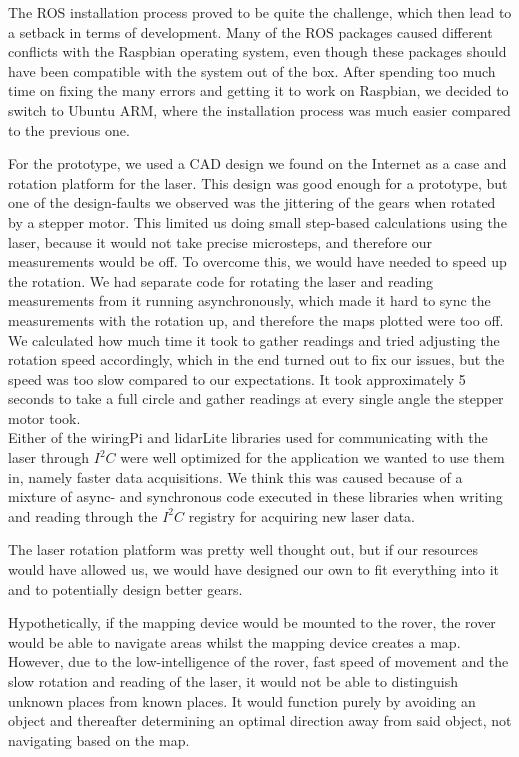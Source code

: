 The ROS installation process proved to be quite the challenge, which then lead to a setback in terms of development. Many of the ROS packages caused different conflicts with the Raspbian operating system, even though these packages should have been compatible with the system out of the box. After spending too much time on fixing the many errors and getting it to work on Raspbian, we decided to switch to Ubuntu ARM, where the installation process was much easier compared to the previous one.

For the prototype, we used a CAD design we found on the Internet as a case and rotation platform for the laser. This design was good enough for a prototype, but one of the design-faults we observed was the jittering of the gears when rotated by a stepper motor. This limited us doing small step-based calculations using the laser, because it would not take precise microsteps, and therefore our measurements would be off. To overcome this, we would have needed to speed up the rotation. We had separate code for rotating the laser and reading measurements from it running asynchronously, which made it hard to sync the measurements with the rotation up, and therefore the maps plotted were too off. We calculated how much time it took to gather readings and tried adjusting the rotation speed accordingly, which in the end turned out to fix our issues, but the speed was too slow compared to our expectations. It took approximately 5 seconds to take a full circle and gather readings at every single angle the stepper motor took.\\ 
Either of the wiringPi and lidarLite libraries used for communicating with the laser through $I^2C$ were well optimized for the application we wanted to use them in, namely faster data acquisitions. We think this was caused because of a mixture of async- and synchronous code executed in these libraries when writing and reading through the $I^2C$ registry for acquiring new laser data.

The laser rotation platform was pretty well thought out, but if our resources would have allowed us, we would have designed our own to fit everything into it and to potentially design better gears.

Hypothetically, if the mapping device would be mounted to the rover, the rover would be able to navigate areas whilst the mapping device creates a map. However, due to the low-intelligence of the rover, fast speed of movement and the slow rotation and reading of the laser, it would not be able to distinguish unknown places from known places. It would function purely by avoiding an object and thereafter determining an optimal direction away from said object, not navigating based on the map. 

